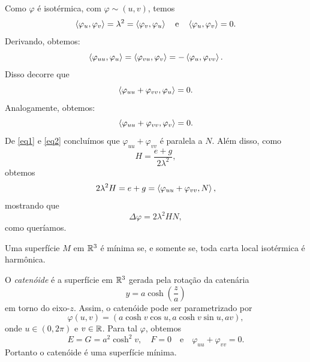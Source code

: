 \begin{demonstracao}
	Como $\varphi$ é isotérmica, com $\varphi \sim (u, v)$, temos
	\begin{equation*}
	\left\langle \varphi_u,\varphi_v \right\rangle = \lambda^2 = \left\langle \varphi_v,\varphi_u \right\rangle \quad \text{e} \quad \left\langle \varphi_u,\varphi_v \right\rangle = 0.
	\end{equation*}
	Derivando, obtemos:
	\begin{equation*}
	\left\langle \varphi_{uu},\varphi_u \right\rangle = \left\langle \varphi_{vu},\varphi_v \right\rangle = - \left\langle \varphi_u,\varphi_{vv} \right\rangle.
	\end{equation*}
	Disso decorre que
	\begin{equation}\label{eq1}
	\left\langle \varphi_{uu} + \varphi_{vv},\varphi_u \right\rangle = 0.
	\end{equation}
	Analogamente, obtemos:
	\begin{equation}\label{eq2}
	\left\langle \varphi_{uu} + \varphi_{vv},\varphi_v \right\rangle = 0.
	\end{equation}
	De \eqref{eq1} e \eqref{eq2} concluímos que $\varphi_{uu} + \varphi_{vv}$ é paralela a $N$. Além disso, como
	\begin{equation}
	H = \frac{e+g}{2 \lambda^2},
	\end{equation}
	obtemos
	\begin{equation*}
		2 \lambda^2 H = e + g = \left\langle \varphi_{uu} + \varphi_{vv},N \right\rangle,
	\end{equation*}
	mostrando que
	\begin{equation}
	\Delta \varphi = 2 \lambda^2 H N,
	\end{equation}
	como queríamos.
\end{demonstracao}

\begin{corolario}\label{equiv_isoterma_harmonica}
	Uma superfície $M$ em $\mathbb{R}^3$ é mínima se, e somente se, toda carta local isotérmica é harmônica.
\end{corolario}

\begin{exemplo}
	O \emph{catenóide} é a superfície em $\mathbb{R}^3$ gerada pela rotação da catenária 
	\begin{equation*}
	y = a \cosh \left( \frac{z}{a} \right)
	\end{equation*}
	em torno do eixo-$z$.
	Assim, o catenóide pode ser parametrizado por
	\begin{equation*}
	\varphi(u,v) = \left( a \cosh v \cos u, a \cosh v \sin u, av \right),
	\end{equation*}
	onde $u \in (0, 2 \pi)$ e $v \in \mathbb{R}$. Para tal $\varphi$, obtemos
	\begin{equation*}
	E = G = a^2 \cosh^2 v, \quad F = 0 \quad \text{e} \quad \varphi_{uu} + \varphi_{vv} = 0.
	\end{equation*}
	Portanto o catenóide é uma superfície mínima.
\end{exemplo}

